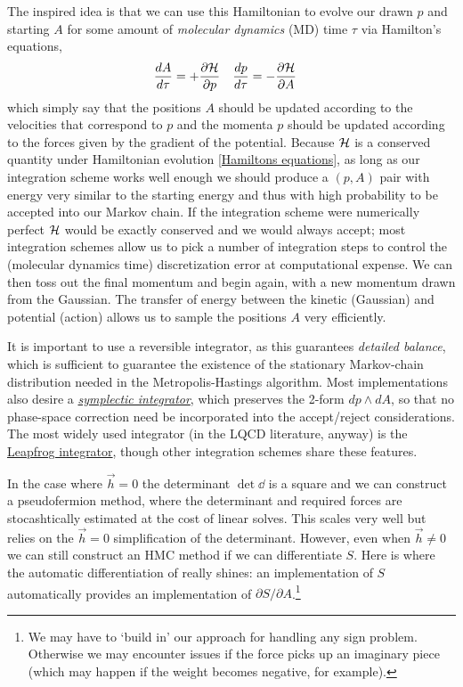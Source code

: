 The inspired idea is that we can use this Hamiltonian to evolve our drawn $p$ and starting $A$ for some amount of \emph{molecular dynamics} (MD) time $\tau$ via Hamilton's equations,
\begin{align}
	\frac{dA}{d\tau} &= +\frac{\partial \mathcal{H}}{\partial p}
	&
	\frac{dp}{d\tau} &= -\frac{\partial \mathcal{H}}{\partial A}
	\label{eq:Hamiltons equations}
\end{align}
which simply say that the positions $A$ should be updated according to the velocities that correspond to $p$ and the momenta $p$ should be updated according to the forces given by the gradient of the potential.
Because $\mathcal{H}$ is a conserved quantity under Hamiltonian evolution \eqref{Hamiltons equations}, as long as our integration scheme works well enough we should produce a $(p, A)$ pair with energy very similar to the starting energy and thus with high probability to be accepted into our Markov chain.
If the integration scheme were numerically perfect $\mathcal{H}$ would be exactly conserved and we would always accept; most integration schemes allow us to pick a number of integration steps to control the (molecular dynamics time) discretization error at computational expense.
We can then toss out the final momentum and begin again, with a new momentum drawn from the Gaussian.
The transfer of energy between the kinetic (Gaussian) and potential (action) allows us to sample the positions $A$ very efficiently.

It is important to use a reversible integrator, as this guarantees \emph{detailed balance}, which is sufficient to guarantee the existence of the stationary Markov-chain distribution needed in the Metropolis-Hastings algorithm.
Most implementations also desire a \href{https://en.wikipedia.org/wiki/Symplectic\_integrator}{\emph{symplectic integrator}}, which preserves the 2-form $dp \wedge dA$, so that no phase-space correction need be incorporated into the accept/reject considerations.
The most widely used integrator (in the LQCD literature, anyway) is the \href{https://en.wikipedia.org/wiki/Leapfrog\_integration}{Leapfrog integrator}, though other integration schemes share these features\cite{PhysRevE.65.056706}.

In the case where $\vec{h}=0$ the determinant $\det \dd$ is a square and we can construct a pseudofermion method, where the determinant and required forces are stocashtically estimated at the cost of linear solves.
This scales very well but relies on the $\vec{h}=0$ simplification of the determinant.
However, even when $\vec{h}\neq0$ we can still construct an HMC method if we can differentiate $S$.
Here is where the automatic differentiation of \pytorch really shines: an implementation of $S$ automatically provides an implementation of $\partial S/\partial A$.\footnote{
	We may have to `build in' our approach for handling any sign problem.
	Otherwise we may encounter issues if the force picks up an imaginary piece (which may happen if the weight becomes negative, for example).
}

